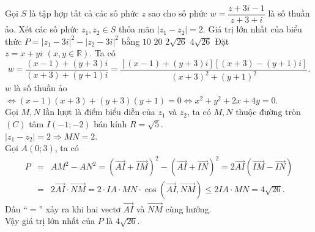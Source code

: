 \begin{ex}%
Gọi $S$ là tập hợp tất cả các số phức $z$ sao cho số phức $w=\dfrac{z+3i-1}{z+3+i}$ là số thuần ảo. Xét các số phức $z_1,z_2\in S$ thỏa mãn $\left |z_1-z_2 \right |=2$. Giá trị lớn nhất của biểu thức $P=\left |z_1-3i \right |^2-\left |z_2-3i \right |^2$ bằng
\choice 
{$10$} 
{$20$}
{$2\sqrt{26}$} 
{\True $4\sqrt{26}$}
\loigiai
{
Đặt $z=x+yi\,\,(x,y\in\mathbb{R})$. Ta có
$$w=\dfrac{(x-1)+(y+3)i}{(x+3)+(y+1)i}=\dfrac{\left [(x-1)+(y+3)i \right ]\left [(x+3)-(y+1)i \right ]}{(x+3)^2+(y+1)^2}.$$
$w$ là số thuần ảo $\Leftrightarrow (x-1)(x+3)+(y+3)(y+1)=0\Leftrightarrow x^2+y^2+2x+4y=0$.\\
Gọi $M,N$ lần lượt là điểm biểu diễn của $z_1$ và $z_2$, ta có $M,N$ thuộc đường tròn $(C)$ tâm $I(-1;-2)$ bán kính $R=\sqrt{5}$.\\
$\left |z_1-z_2 \right |=2\Rightarrow MN=2$.\\
Gọi $A(0;3)$, ta có
\begin{eqnarray*}
P&=&AM^2-AN^2=\left (\overrightarrow{AI}+\overrightarrow{IM} \right )^2-\left (\overrightarrow{AI}+\overrightarrow{IN} \right )^2=2\overrightarrow{AI}\left (\overrightarrow{IM}-\overrightarrow{IN} \right )\\&=&2\overrightarrow{AI}\cdot\overrightarrow{NM}=2\cdot IA\cdot MN\cdot\cos\left (\overrightarrow{AI},\overrightarrow{NM} \right )\le 2IA\cdot MN=4\sqrt{26}.
\end{eqnarray*}
Dấu ``$=$'' xảy ra khi hai vectơ $\overrightarrow{AI}$ và $\overrightarrow{NM}$ cùng hướng.\\
Vậy giá trị lớn nhất của $P$ là $4\sqrt{26}$.
}
\end{ex}

